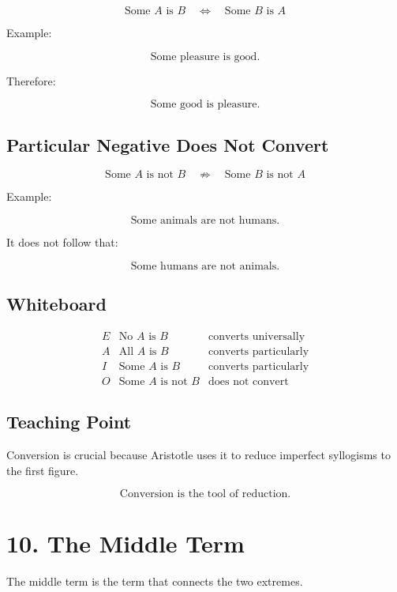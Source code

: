 \documentclass[12pt]{article}
\begin{document}
\[
\text{Some } A \text{ is } B
\quad \Longleftrightarrow \quad
\text{Some } B \text{ is } A
\]

Example:

\[
\text{Some pleasure is good.}
\]

Therefore:

\[
\text{Some good is pleasure.}
\]

\subsection*{Particular Negative Does Not Convert}

\[
\text{Some } A \text{ is not } B
\quad \not\Longrightarrow \quad
\text{Some } B \text{ is not } A
\]

Example:

\[
\text{Some animals are not humans.}
\]

It does not follow that:

\[
\text{Some humans are not animals.}
\]

\subsection*{Whiteboard}

\[
\begin{array}{lll}
E & \text{No } A \text{ is } B & \text{converts universally} \\
A & \text{All } A \text{ is } B & \text{converts particularly} \\
I & \text{Some } A \text{ is } B & \text{converts particularly} \\
O & \text{Some } A \text{ is not } B & \text{does not convert}
\end{array}
\]

\subsection*{Teaching Point}

Conversion is crucial because Aristotle uses it to reduce imperfect syllogisms
to the first figure.

\[
\boxed{
\text{Conversion is the tool of reduction.}
}
\]

\section*{10. The Middle Term}

The middle term is the term that connects the two extremes.
\end{document}
